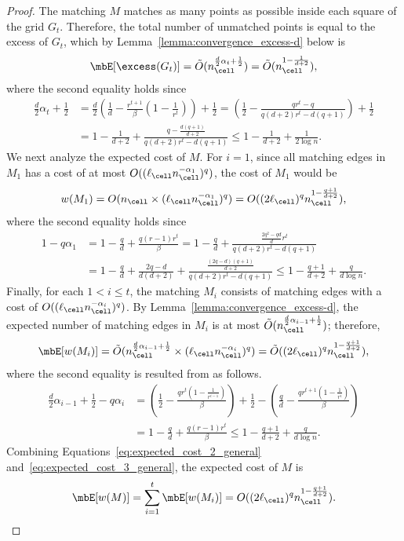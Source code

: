 \begin{proof}
The matching $M$ matches as many points as possible inside each square of the grid $G_t$. Therefore, the total number of unmatched points is equal to the excess of $G_t$, which by Lemma~\ref{lemma:convergence_excess-d} below is 
\begin{align}
    \mbE[\excess(G_t)] = \tilde{O}(n_\cell^{\frac{d}{2}\alpha_t+\frac{1}{2}}) = \tilde{O}(n_\cell^{1 - \frac{1}{d+2}}), \label{eq:expected_free_general}
\end{align}
where the second equality holds since
\begin{align*}
    \frac{d}{2}\alpha_t+\frac{1}{2} &= \frac{d}{2}\left(\frac{1}{d} - \frac{r^{t+1}}{\beta}(1-\frac{1}{r^t}) \right) + \frac{1}{2}= \left(\frac{1}{2} - \frac{qr^{t}-q}{q(d+2)r^t - d(q+1)} \right) + \frac{1}{2}\\ &= 1 - \frac{1}{d+2} + \frac{q-\frac{d(q+1)}{d+2}}{q(d+2)r^t - d(q+1)} \le 1 - \frac{1}{d+2} + \frac{1}{2\log n}. 
\end{align*}
We next analyze the expected cost of $M$. For $i=1$, since all matching edges in $M_1$ has a cost of at most $O((\ell_\cell n_\cell^{-\alpha_1})^q)$, the cost of $M_1$ would be 
\begin{equation}
    w(M_1) = O(n_\cell\times (\ell_\cell n_\cell^{-\alpha_1})^q) = O((2\ell_\cell)^q n_\cell^{1-\frac{q+1}{d+2}}),\label{eq:expected_cost_2_general}
\end{equation}
where the second equality holds since
\begin{align*}
    1-q\alpha_1 &= 1-\frac{q}{d}+\frac{q(r-1)r^t}{\beta}= 1-\frac{q}{d}+\frac{\frac{2q^2-qd}{d}r^t}{q(d+2)r^t - d(q+1)} \\ &= 1-\frac{q}{d}+\frac{2q-d}{d(d+2)} + \frac{\frac{(2q-d)(q+1)}{d+2}}{q(d+2)r^t - d(q+1)}\le 1-\frac{q+1}{d+2} + \frac{q}{d\log n}.
\end{align*}
Finally, for each $1<i\le t$, the matching $M_i$ consists of matching edges with a cost of $O((\ell_\cell n_\cell^{-\alpha_i})^q)$. By Lemma~\ref{lemma:convergence_excess-d}, the expected number of matching edges in $M_i$ is at most $\tilde{O}(n_\cell^{\frac{d}{2}\alpha_{i-1}+\frac{1}{2}})$; therefore,
\begin{equation}
    \mbE[w(M_i)] = \tilde{O}(n_\cell^{\frac{d}{2}\alpha_{i-1}+\frac{1}{2}}\times (\ell_\cell n_\cell^{-\alpha_i})^q) = \tilde{O}((2\ell_\cell)^q n_\cell^{1-\frac{q+1}{d+2}}),\label{eq:expected_cost_3_general}
\end{equation}
where the second equality is resulted from as follows.
\begin{align*}
    \frac{d}{2}\alpha_{i-1} + \frac{1}{2}-q\alpha_i &= \left(\frac{1}{2}-\frac{qr^t(1-\frac{1}{r^{i-1}})}{\beta}\right) + \frac{1}{2} - \left(\frac{q}{d}-\frac{qr^{t+1}(1-\frac{1}{r^{i}})}{\beta}\right)\\ &=  1-\frac{q}{d}+\frac{q(r-1)r^t}{\beta}\le 1-\frac{q+1}{d+2} + \frac{q}{d\log n}.
\end{align*}
Combining Equations~\eqref{eq:expected_cost_2_general} and~\eqref{eq:expected_cost_3_general}, the expected cost of $M$ is \[\mbE[w(M)]=\sum_{i=1}^t\mbE[w(M_i)]=O((2\ell_\cell)^qn_\cell^{1-\frac{q+1}{d+2}}).\]
\end{proof}

